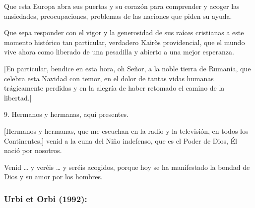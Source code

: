 \begin{body}
							Que esta Europa abra sus puertas y su corazón para comprender y acoger las ansiedades, preocupaciones, problemas de las naciones que piden su ayuda.
							
							Que sepa responder con el vigor y la generosidad de sus raíces cristianas a este momento histórico tan particular, verdadero Kairòs providencial, que el mundo vive ahora como liberado de una pesadilla y abierto a una mejor esperanza.
							
							{[}En particular, bendice en esta hora, oh Señor, a la noble tierra de Rumanía, que celebra esta Navidad con temor, en el dolor de tantas vidas humanas trágicamente perdidas y en la alegría de haber retomado el camino de la libertad.{]}
							
							9. Hermanos y hermanas, aquí presentes.
							
							{[}Hermanos y hermanas, que me escuchan en la radio y la televisión, en todos los Continentes,{]} venid a la cuna del Niño indefenso, que es el Poder de Dios, Él nació por nosotros.
							
							Venid \ldots{} y veréis \ldots{} y seréis acogidos, porque hoy se ha manifestado la bondad de Dios y su amor por los hombres.
						\end{body}


					\subsubsection{Urbi et Orbi (1992):}

